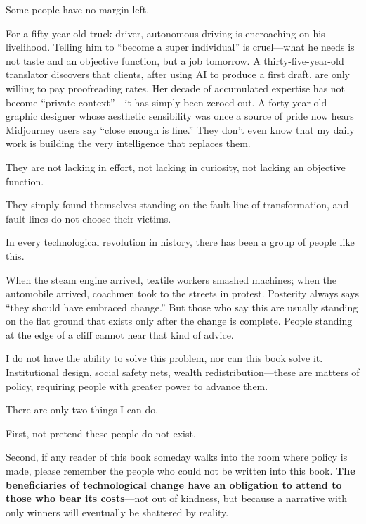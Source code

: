 \vspace{1em}

Some people have no margin left.

For a fifty-year-old truck driver, autonomous driving is encroaching on his livelihood. Telling him to ``become a super individual'' is cruel---what he needs is not taste and an objective function, but a job tomorrow. A thirty-five-year-old translator discovers that clients, after using AI to produce a first draft, are only willing to pay proofreading rates. Her decade of accumulated expertise has not become ``private context''---it has simply been zeroed out. A forty-year-old graphic designer whose aesthetic sensibility was once a source of pride now hears Midjourney users say ``close enough is fine.'' They don't even know that my daily work is building the very intelligence that replaces them.

\vspace{1em}

They are not lacking in effort, not lacking in curiosity, not lacking an objective function.

They simply found themselves standing on the fault line of transformation, and fault lines do not choose their victims.

\vspace{1em}

In every technological revolution in history, there has been a group of people like this.

When the steam engine arrived, textile workers smashed machines; when the automobile arrived, coachmen took to the streets in protest. Posterity always says ``they should have embraced change.'' But those who say this are usually standing on the flat ground that exists only after the change is complete. People standing at the edge of a cliff cannot hear that kind of advice.

\vspace{1em}

I do not have the ability to solve this problem, nor can this book solve it. Institutional design, social safety nets, wealth redistribution---these are matters of policy, requiring people with greater power to advance them.

\vspace{1em}

There are only two things I can do.

First, not pretend these people do not exist.

Second, if any reader of this book someday walks into the room where policy is made, please remember the people who could not be written into this book. \textbf{The beneficiaries of technological change have an obligation to attend to those who bear its costs}---not out of kindness, but because a narrative with only winners will eventually be shattered by reality.

